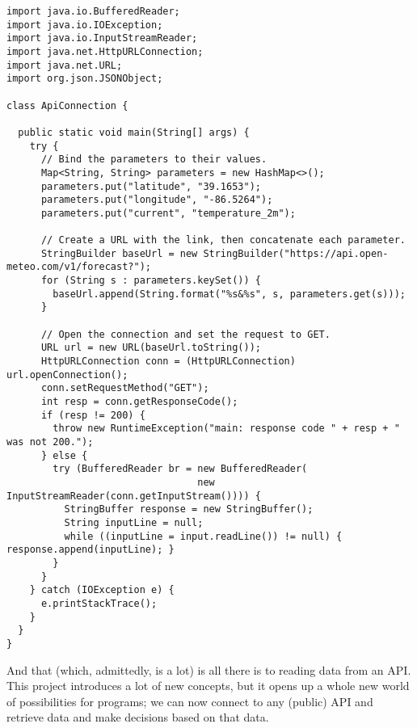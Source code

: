 \begin{cl}[]{}
\begin{lstlisting}[language=MyJava]
import java.io.BufferedReader;
import java.io.IOException;
import java.io.InputStreamReader;
import java.net.HttpURLConnection;
import java.net.URL;
import org.json.JSONObject;

class ApiConnection {

  public static void main(String[] args) {
    try {
      // Bind the parameters to their values.
      Map<String, String> parameters = new HashMap<>();
      parameters.put("latitude", "39.1653");
      parameters.put("longitude", "-86.5264");
      parameters.put("current", "temperature_2m");

      // Create a URL with the link, then concatenate each parameter.
      StringBuilder baseUrl = new StringBuilder("https://api.open-meteo.com/v1/forecast?");
      for (String s : parameters.keySet()) { 
        baseUrl.append(String.format("%s&%s", s, parameters.get(s))); 
      }
    
      // Open the connection and set the request to GET.
      URL url = new URL(baseUrl.toString());
      HttpURLConnection conn = (HttpURLConnection) url.openConnection();
      conn.setRequestMethod("GET");
      int resp = conn.getResponseCode();
      if (resp != 200) {
        throw new RuntimeException("main: response code " + resp + " was not 200.");
      } else {
        try (BufferedReader br = new BufferedReader(
                                 new InputStreamReader(conn.getInputStream()))) {
          StringBuffer response = new StringBuffer();
          String inputLine = null;
          while ((inputLine = input.readLine()) != null) { response.append(inputLine); }
        }
      }
    } catch (IOException e) {
      e.printStackTrace();
    }
  }
}
\end{lstlisting}
\end{cl}

And that (which, admittedly, is a lot) is all there is to reading data from an API. This project introduces a lot of new concepts, but it opens up a whole new world of possibilities for programs; we can now connect to any (public) API and retrieve data and make decisions based on that data.